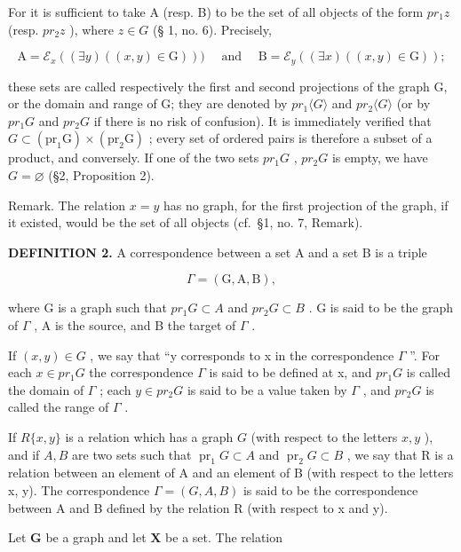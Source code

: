 For it is sufficient to take A (resp. B) to be the set of all objects of the form \(pr_{1}z\) (resp. \(pr_{2}z\) ), where \(z \in G\) (§ 1, no. 6). Precisely,

\[
\mathrm{A} = \mathcal {E} _ {x} ((\exists y) ((x, y) \in \mathrm{G}))) \quad \text { and } \quad \mathrm{B} = \mathcal {E} _ {y} ((\exists x) ((x, y) \in \mathrm{G}));
\]

these sets are called respectively the first and second projections of the graph G, or the domain and range of G; they are denoted by \(pr_{1}\langle G\rangle\) and \(pr_{2}\langle G\rangle\) (or by \(pr_{1}G\) and \(pr_{2}G\) if there is no risk of confusion). It is immediately verified that \(G\subset(\mathrm{pr}_{1}\mathrm{G})\times(\mathrm{pr}_{2}\mathrm{G})\) ; every set of ordered pairs is therefore a subset of a product, and conversely. If one of the two sets \(pr_{1}G\) , \(pr_{2}G\) is empty, we have \(G=\varnothing\) (§2, Proposition 2).

Remark. The relation \(x = y\) has no graph, for the first projection of the graph, if it existed, would be the set of all objects (cf.~§1, no. 7, Remark).

\textbf{DEFINITION 2.} A correspondence between a set A and a set B is a triple

\[
\Gamma = (\mathrm{G}, \mathrm{A}, \mathrm{B}),
\]

where G is a graph such that \(pr_{1}G \subset A\) and \(pr_{2}G \subset B\) . G is said to be the graph of \(\Gamma\) , A is the source, and B the target of \(\Gamma\) .

If \((x, y) \in G\) , we say that ``y corresponds to x in the correspondence \(\Gamma\) ''. For each \(x \in pr_{1}G\) the correspondence \(\Gamma\) is said to be defined at x, and \(pr_{1}G\) is called the domain of \(\Gamma\) ; each \(y \in pr_{2}G\) is said to be a value taken by \(\Gamma\) , and \(pr_{2}G\) is called the range of \(\Gamma\) .

If \(R\{x, y\}\) is a relation which has a graph \(G\) (with respect to the letters \(x, y\) ), and if \(A, B\) are two sets such that \(\operatorname{pr}_1 G \subset A\) and \(\operatorname{pr}_2 G \subset B\) , we say that R is a relation between an element of A and an element of B (with respect to the letters x, y). The correspondence \(\Gamma = (G, A, B)\) is said to be the correspondence between A and B defined by the relation R (with respect to x and y).

Let \(\mathbf{G}\) be a graph and let \(\mathbf{X}\) be a set. The relation

